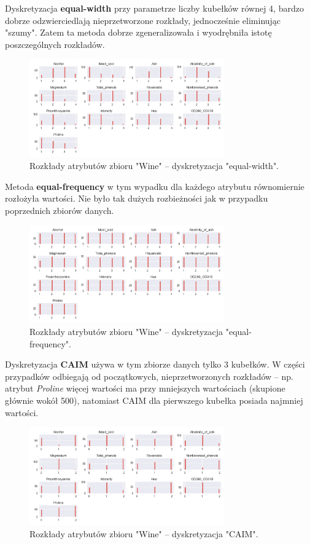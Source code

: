     Dyskretyzacja \textbf{equal-width} przy parametrze liczby kubełków równej 4, bardzo
    dobrze odzwierciedlają nieprzetworzone rozkłady, jednocześnie eliminując "szumy".
    Zatem ta metoda dobrze zgeneralizowała i wyodrębniła istotę poszczególnych rozkładów.

    \begin{figure}[H]
        \center
        \includegraphics[width=0.75\textwidth]{img/discretization/ew_wine.png}
        \caption{Rozkłady atrybutów zbioru "Wine" -- dyskretyzacja "equal-width".}
    \end{figure}

    \pagebreak
    Metoda \textbf{equal-frequency} w tym wypadku dla każdego atrybutu równomiernie
    rozłożyła wartości. Nie było tak dużych rozbieżności jak w przypadku poprzednich
    zbiorów danych.

    \begin{figure}[H]
        \center
        \includegraphics[width=0.75\textwidth]{img/discretization/ef_wine.png}
        \caption{Rozkłady atrybutów zbioru "Wine" -- dyskretyzacja "equal-frequency".}
    \end{figure}

    Dyskretyzacja \textbf{CAIM} używa w tym zbiorze danych tylko 3 kubełków. W części
    przypadków odbiegają od początkowych, nieprzetworzonych rozkładów -- np. atrybut
    \textit{Proline} więcej wartości ma przy mniejszych wartościach (skupione głównie
    wokół 500), natomiast CAIM dla pierwszego kubełka posiada najmniej wartości.

    \begin{figure}[H]
        \center
        \includegraphics[width=0.75\textwidth]{img/discretization/caim_wine.png}
        \caption{Rozkłady atrybutów zbioru "Wine" -- dyskretyzacja "CAIM".}
    \end{figure}
